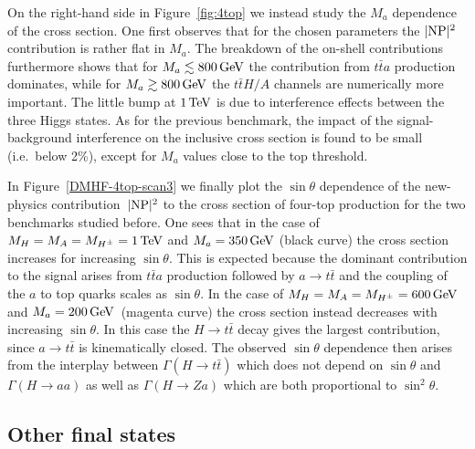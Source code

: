 \documentclass[a4paper, 11pt,notoc]{article}
\newcommand{\mA}{\ensuremath{M_{A}}\xspace}
\newcommand{\ma}{\ensuremath{M_{a}}\xspace}
\newcommand{\mH}{\ensuremath{M_{H}}\xspace}
\newcommand{\mHc}{\ensuremath{M_{H^{\pm}}}\xspace}
\begin{document}
On the right-hand side in Figure~\ref{fig:4top} we instead  study the $\ma$ dependence of the cross section. One first observes that for the chosen parameters the $|{\rm NP}|^2$ contribution is rather flat in $\ma$. The breakdown of the on-shell contributions furthermore shows that for $\ma \lesssim 800 \, {\rm GeV}$ the contribution from $t \bar t a$ production dominates, while for $\ma \gtrsim 800 \, {\rm GeV}$ the $t \bar t H/A$ channels are numerically more important. The little bump at $1 \, {\rm TeV}$ is due to interference effects between the three Higgs states.  As for the previous benchmark,  the impact of the signal-background interference on the inclusive cross section is found to be small (i.e.~below 2\%), except for $\ma$ values close to the top threshold. 

In Figure~\ref{DMHF-4top-scan3} we finally plot the  $\sin \theta$ dependence of the new-physics contribution~$|{\rm NP}|^2$ to the cross section of four-top production for the two benchmarks studied before. 
 One sees that in the case of $\mH =\mA=\mHc = 1 \, {\rm TeV}$ and $\ma = 350 \, {\rm GeV}$ (black curve) the cross section  increases for increasing $\sin \theta$. This is expected because the dominant contribution to the signal arises from $t \bar t  a$ production followed by $a \to t \bar t$ and the coupling of the $a$ to top quarks scales as $\sin \theta$. In the case of $\mH =\mA=\mHc = 600 \, {\rm GeV}$ and $\ma = 200 \, {\rm GeV}$~(magenta curve) the cross section instead decreases with increasing $\sin \theta$.  In this case  the $H \to t \bar t$ decay gives the largest  contribution, since $a \to t \bar t$ is kinematically closed. The observed $\sin \theta$ dependence then arises from the interplay between $\Gamma (H \to t \bar t)$ which does not depend on $\sin \theta$ and $\Gamma (H \to aa)$ as well as $\Gamma (H \to Za)$ which are both proportional to $\sin^2 \theta$.
 
\subsection{Other final states}
\label{sec:others}
\end{document}
